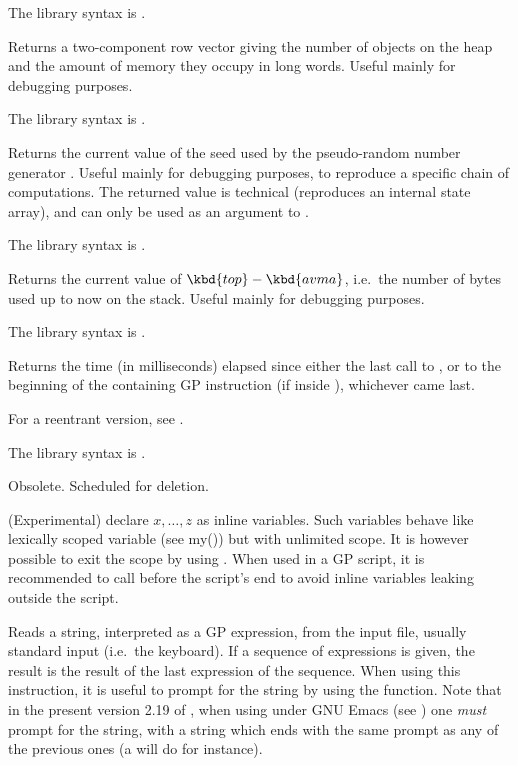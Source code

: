 The library syntax is .

\label{se:getheap}
Returns a two-component row vector giving the
number of objects on the heap and the amount of memory they occupy in long
words. Useful mainly for debugging purposes.

The library syntax is .

\label{se:getrand}
Returns the current value of the seed used by the
pseudo-random number generator . Useful mainly for debugging
purposes, to reproduce a specific chain of computations. The returned value
is technical (reproduces an internal state array), and can only be used as an
argument to .

The library syntax is .

\label{se:getstack}
Returns the current value of $\kbd{top}-\kbd{avma}$, i.e.~the number of
bytes used up to now on the stack. Useful mainly for debugging purposes.

The library syntax is .

\label{se:gettime}
Returns the time (in milliseconds) elapsed since either the last call to
, or to the beginning of the containing GP instruction (if
inside ), whichever came last.

For a reentrant version, see .

The library syntax is .

\label{se:global}
Obsolete. Scheduled for deletion.

\label{se:inline}
(Experimental) declare $x,\ldots, z$ as inline variables. Such variables
behave like lexically scoped variable (see my()) but with unlimited scope.
It is however possible to exit the scope by using .
When used in a GP script, it is recommended to call  before
the script's end to avoid inline variables leaking outside the script.

\label{se:input}
Reads a string, interpreted as a GP expression,
from the input file, usually standard input (i.e.~the keyboard). If a
sequence of expressions is given, the result is the result of the last
expression of the sequence. When using this instruction, it is useful to
prompt for the string by using the  function. Note that in the
present version 2.19 of , when using  under GNU Emacs (see
) one \emph{must} prompt for the string, with a string
which ends with the same prompt as any of the previous ones (a 
will do for instance).

